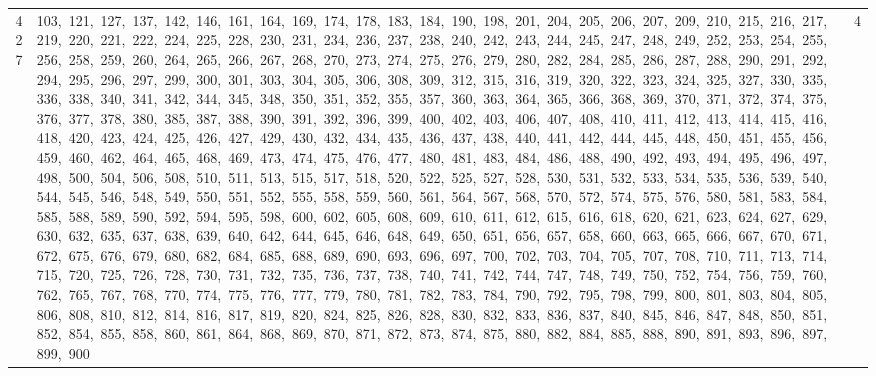 \begin{longtable}{c|p{}|r}
427 & 103,\ 121,\ 127,\ 137,\ 142,\ 146,\ 161,\ 164,\ 169,\ 174,\ 178,\ 183,\ 184,\ 190,\ 198,\ 201,\ 204,\ 205,\ 206,\ 207,\ 209,\ 210,\ 215,\ 216,\ 217,\ 219,\ 220,\ 221,\ 222,\ 224,\ 225,\ 228,\ 230,\ 231,\ 234,\ 236,\ 237,\ 238,\ 240,\ 242,\ 243,\ 244,\ 245,\ 247,\ 248,\ 249,\ 252,\ 253,\ 254,\ 255,\ 256,\ 258,\ 259,\ 260,\ 264,\ 265,\ 266,\ 267,\ 268,\ 270,\ 273,\ 274,\ 275,\ 276,\ 279,\ 280,\ 282,\ 284,\ 285,\ 286,\ 287,\ 288,\ 290,\ 291,\ 292,\ 294,\ 295,\ 296,\ 297,\ 299,\ 300,\ 301,\ 303,\ 304,\ 305,\ 306,\ 308,\ 309,\ 312,\ 315,\ 316,\ 319,\ 320,\ 322,\ 323,\ 324,\ 325,\ 327,\ 330,\ 335,\ 336,\ 338,\ 340,\ 341,\ 342,\ 344,\ 345,\ 348,\ 350,\ 351,\ 352,\ 355,\ 357,\ 360,\ 363,\ 364,\ 365,\ 366,\ 368,\ 369,\ 370,\ 371,\ 372,\ 374,\ 375,\ 376,\ 377,\ 378,\ 380,\ 385,\ 387,\ 388,\ 390,\ 391,\ 392,\ 396,\ 399,\ 400,\ 402,\ 403,\ 406,\ 407,\ 408,\ 410,\ 411,\ 412,\ 413,\ 414,\ 415,\ 416,\ 418,\ 420,\ 423,\ 424,\ 425,\ 426,\ 427,\ 429,\ 430,\ 432,\ 434,\ 435,\ 436,\ 437,\ 438,\ 440,\ 441,\ 442,\ 444,\ 445,\ 448,\ 450,\ 451,\ 455,\ 456,\ 459,\ 460,\ 462,\ 464,\ 465,\ 468,\ 469,\ 473,\ 474,\ 475,\ 476,\ 477,\ 480,\ 481,\ 483,\ 484,\ 486,\ 488,\ 490,\ 492,\ 493,\ 494,\ 495,\ 496,\ 497,\ 498,\ 500,\ 504,\ 506,\ 508,\ 510,\ 511,\ 513,\ 515,\ 517,\ 518,\ 520,\ 522,\ 525,\ 527,\ 528,\ 530,\ 531,\ 532,\ 533,\ 534,\ 535,\ 536,\ 539,\ 540,\ 544,\ 545,\ 546,\ 548,\ 549,\ 550,\ 551,\ 552,\ 555,\ 558,\ 559,\ 560,\ 561,\ 564,\ 567,\ 568,\ 570,\ 572,\ 574,\ 575,\ 576,\ 580,\ 581,\ 583,\ 584,\ 585,\ 588,\ 589,\ 590,\ 592,\ 594,\ 595,\ 598,\ 600,\ 602,\ 605,\ 608,\ 609,\ 610,\ 611,\ 612,\ 615,\ 616,\ 618,\ 620,\ 621,\ 623,\ 624,\ 627,\ 629,\ 630,\ 632,\ 635,\ 637,\ 638,\ 639,\ 640,\ 642,\ 644,\ 645,\ 646,\ 648,\ 649,\ 650,\ 651,\ 656,\ 657,\ 658,\ 660,\ 663,\ 665,\ 666,\ 667,\ 670,\ 671,\ 672,\ 675,\ 676,\ 679,\ 680,\ 682,\ 684,\ 685,\ 688,\ 689,\ 690,\ 693,\ 696,\ 697,\ 700,\ 702,\ 703,\ 704,\ 705,\ 707,\ 708,\ 710,\ 711,\ 713,\ 714,\ 715,\ 720,\ 725,\ 726,\ 728,\ 730,\ 731,\ 732,\ 735,\ 736,\ 737,\ 738,\ 740,\ 741,\ 742,\ 744,\ 747,\ 748,\ 749,\ 750,\ 752,\ 754,\ 756,\ 759,\ 760,\ 762,\ 765,\ 767,\ 768,\ 770,\ 774,\ 775,\ 776,\ 777,\ 779,\ 780,\ 781,\ 782,\ 783,\ 784,\ 790,\ 792,\ 795,\ 798,\ 799,\ 800,\ 801,\ 803,\ 804,\ 805,\ 806,\ 808,\ 810,\ 812,\ 814,\ 816,\ 817,\ 819,\ 820,\ 824,\ 825,\ 826,\ 828,\ 830,\ 832,\ 833,\ 836,\ 837,\ 840,\ 845,\ 846,\ 847,\ 848,\ 850,\ 851,\ 852,\ 854,\ 855,\ 858,\ 860,\ 861,\ 864,\ 868,\ 869,\ 870,\ 871,\ 872,\ 873,\ 874,\ 875,\ 880,\ 882,\ 884,\ 885,\ 888,\ 890,\ 891,\ 893,\ 896,\ 897,\ 899,\ 900 & 4 \\

\end{longtable}
